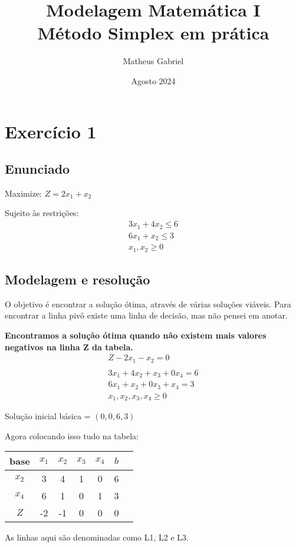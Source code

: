 \documentclass{article}
\title{Modelagem Matemática I\\
    \large Método Simplex em prática}
\author{Matheus Gabriel}
\date{Agosto 2024}
\begin{document}
\maketitle

\section{Exercício 1}

\subsection{Enunciado}
Maximize: $Z =2x_1 + x_2$

Sujeito às restrições:
\begin{align*}
    3x_1+4x_2 \leq 6 \\
    6x_1+x_2 \leq 3 \\
    x_1,x_2 \geq 0
\end{align*}

\subsection{Modelagem e resolução}
O objetivo é encontrar a solução ótima, através de várias soluções viáveis. Para encontrar a linha pivô existe uma linha de decisão,  mas não pensei em anotar.

\textbf{Encontramos a solução ótima quando não existem mais valores negativos na linha Z da tabela.}
\begin{align*}
Z - 2x_1-x_2 = 0 \\
\\
    3x_1 + 4x_2 + x_3 + 0x_4 = 6 \\
    6x_1 + x_2 + 0x_3 + x_4 = 3 \\
    x_1,x_2,x_3,x_4 \geq 0
\end{align*}

Solução inicial básica = $(0,0,6,3)$

Agora colocando isso tudo na tabela:

\begin{table}[h!]
    \centering
    \begin{tabular}{ c | c c c c | c c}
       base  & $x_1$ & $x_2$ & $x_3$ & $x_4$ & $b$ \\
       \hline
        $x_2$ & 3 & 4 & 1 & 0 & 6 \\
        $x_4$ & 6 & 1 & 0 & 1 & 3 \\
        \hline
        $Z$ & -2 & -1 & 0 & 0 & 0 \\
    \end{tabular}
\end{table}
As linhas aqui são denominadas como L1, L2 e L3.
\end{document}
